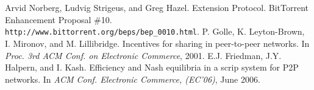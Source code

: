 \documentclass[11pt]{article}
\begin{document}
\begin{thebibliography}{1}
Arvid Norberg, Ludvig Strigeus, and Greg Hazel.  Extension Protocol.  BitTorrent Enhancement Proposal \#10.  {\tt
  http://www.bittorrent.org/beps/bep\_0010.html}.
P. Golle, K. Leyton-Brown, I. Mironov, and M. Lillibridge.  Incentives for sharing in peer-to-peer networks.  In {\em Proc. 3rd ACM Conf. on Electronic Commerce}, 2001.
E.J. Friedman, J.Y. Halpern, and I. Kash.  Efficiency and Nash equilibria in a scrip system for P2P networks.  In {\em ACM Conf. Electronic Commerce, (EC'06)}, June 2006.
\end{thebibliography}
\end{document}
